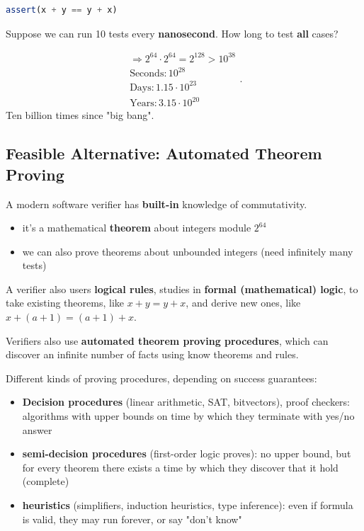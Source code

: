 \documentclass[11pt]{article}
\begin{document}
\begin{lstlisting}[language=Octave]
	assert(x + y == y + x)
\end{lstlisting}

Suppose we can run 10 tests every \textbf{nanosecond}. How long to test \textbf{all} cases?

\[
\begin{aligned}
\Rightarrow 2^{64} \cdot 2^{64} = 2^{128} > 10^{38} \\ 
\text{Seconds:} \, 10^{28} \\
\text{Days:} \, 1.15 \cdot 10^{23} \\
\text{Years:} \, 3.15 \cdot 10^{20}
\end{aligned}
.\]
Ten billion times since "big bang". 

\subsection*{Feasible Alternative: Automated Theorem Proving}

A modern software verifier has \textbf{built-in} knowledge of commutativity. 
\begin{itemize}
	\item it's a mathematical \textbf{theorem} about integers module $2^{64}$
	\item we can also prove theorems about unbounded integers (need infinitely many tests)
\end{itemize}

A verifier also users \textbf{logical rules}, studies in \textbf{formal (mathematical) logic}, to take existing theorems, like $x + y = y + x$, and derive new ones, like $x + (a + 1) = (a + 1) + x$.

Verifiers also use \textbf{automated theorem proving procedures}, which can discover an infinite number of facts using know theorems and rules. 

Different kinds of proving procedures, depending on success guarantees: 

\begin{itemize}
	\item \textbf{Decision procedures} (linear arithmetic, SAT, bitvectors), proof checkers: algorithms with upper bounds on time by which they terminate with yes/no answer
	\item \textbf{semi-decision procedures} (first-order logic proves): no upper bound, but for every theorem there exists a time by which they discover that it hold (complete)
	\item \textbf{heuristics} (simplifiers, induction heuristics, type inference): even if formula is valid, they may run forever, or say "don't know"
\end{itemize}
\end{document}
